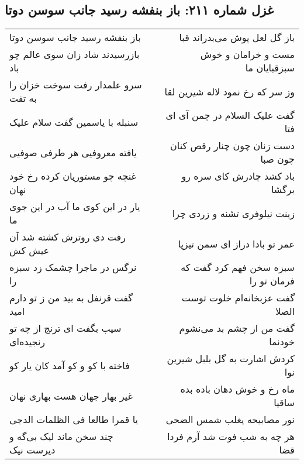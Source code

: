 \begin{center}
\section*{غزل شماره ۲۱۱: باز بنفشه رسید جانب سوسن دوتا}
\label{sec:0211}
\begin{longtable}{l p{0.5cm} r}
باز بنفشه رسید جانب سوسن دوتا
&&
باز گل لعل پوش می‌بدراند قبا
\\
بازرسیدند شاد زان سوی عالم چو باد
&&
مست و خرامان و خوش سبزقبایان ما
\\
سرو علمدار رفت سوخت خزان را به تفت
&&
وز سر که رخ نمود لاله شیرین لقا
\\
سنبله با یاسمین گفت سلام علیک
&&
گفت علیک السلام در چمن آی ای فتا
\\
یافته معروفیی هر طرفی صوفیی
&&
دست زنان چون چنار رقص کنان چون صبا
\\
غنچه چو مستوریان کرده رخ خود نهان
&&
باد کشد چادرش کای سره رو برگشا
\\
یار در این کوی ما آب در این جوی ما
&&
زینت نیلوفری تشنه و زردی چرا
\\
رفت دی روترش کشته شد آن عیش کش
&&
عمر تو بادا دراز ای سمن تیزپا
\\
نرگس در ماجرا چشمک زد سبزه را
&&
سبزه سخن فهم کرد گفت که فرمان تو را
\\
گفت قرنفل به بید من ز تو دارم امید
&&
گفت عزبخانه‌ام خلوت توست الصلا
\\
سیب بگفت ای ترنج از چه تو رنجیده‌ای
&&
گفت من از چشم بد می‌نشوم خودنما
\\
فاخته با کو و کو آمد کان یار کو
&&
کردش اشارت به گل بلبل شیرین نوا
\\
غیر بهار جهان هست بهاری نهان
&&
ماه رخ و خوش دهان باده بده ساقیا
\\
یا قمرا طالعا فی الظلمات الدجی
&&
نور مصابیحه یغلب شمس الضحی
\\
چند سخن ماند لیک بی‌گه و دیرست نیک
&&
هر چه به شب فوت شد آرم فردا قضا
\\
\end{longtable}
\end{center}
